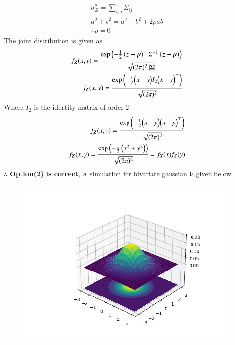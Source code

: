 \begin{enumerate}
\begin{align}
\sigma_{Z}^2=\displaystyle\sum_{i,j}\Sigma_{ij}\\
a^2+b^2=a^2+b^2+2\rho ab\\
\therefore \rho=0\label{dec/2015/109/eq:rho}
\end{align}
The joint distribution is given as
\begin{align}
f_{\boldsymbol{Z}}(x,y)=\frac{\text{exp}\left(-\frac{1}{2}\left(\boldsymbol{z-\mu}\right)^\top\boldsymbol{\Sigma}^{-1}\left(\boldsymbol{z-\mu}\right)\right)}{\sqrt{(2\pi)^2\left\vert\boldsymbol{\Sigma}\right\vert}}\\
f_{\boldsymbol{Z}}(x,y)=\frac{\text{exp}\left(-\frac{1}{2}{\begin{pmatrix} x &y\end{pmatrix}} I_2{\begin{pmatrix} x &y\end{pmatrix}}^\top\right)}{\sqrt{(2\pi)^2}}
\end{align}
Where $I_2$ is the identity matrix of order 2
\begin{align}
f_{\boldsymbol{Z}}(x,y)=\frac{\text{exp}\left(-\frac{1}{2}{\begin{pmatrix} x &y\end{pmatrix}} {\begin{pmatrix} x &y\end{pmatrix}}^\top\right)}{\sqrt{(2\pi)^2}}\\
f_{\boldsymbol{Z}}(x,y)=\frac{\text{exp}\left(-\frac{1}{2}\left(x^2+y^2\right)\right)}{\sqrt{(2\pi)^2}}=f_X(x)f_Y(y)
\end{align}
$\therefore$ \textbf{Option(2) is correct}, A simulation for bivariate gaussian is given below
\begin{figure}[!ht]
\centering
\includegraphics[width=\columnwidth]{solutions/2015/dec/109/figure/plot.png}

\end{figure}
\end{enumerate}
